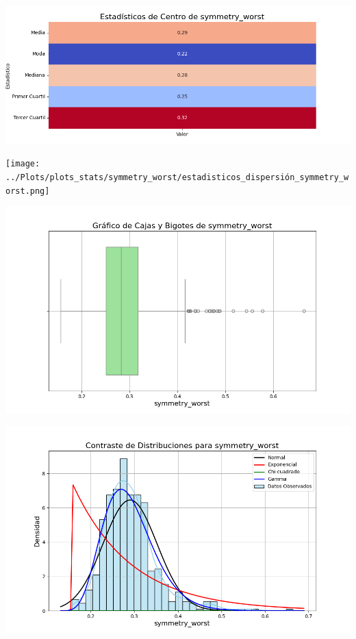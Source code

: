 \documentclass[a4paper, 12pt]{article}
\begin{document}
\includegraphics[width=\textwidth]{../Plots/plots_stats/symmetry_worst/estadisticas_centro_symmetry_worst.png}




\texttt{[image: ../Plots/plots\_stats/symmetry\_worst/estadisticos\_dispersión\_symmetry\_worst.png]}



\includegraphics[width=\textwidth]{../Plots/plots_stats/symmetry_worst/boxplot_symmetry_worst.png}




\includegraphics[width=\textwidth]{../Plots/plots_stats/symmetry_worst/distribuciones_conocidas_symmetry_worst.png}
\end{document}

